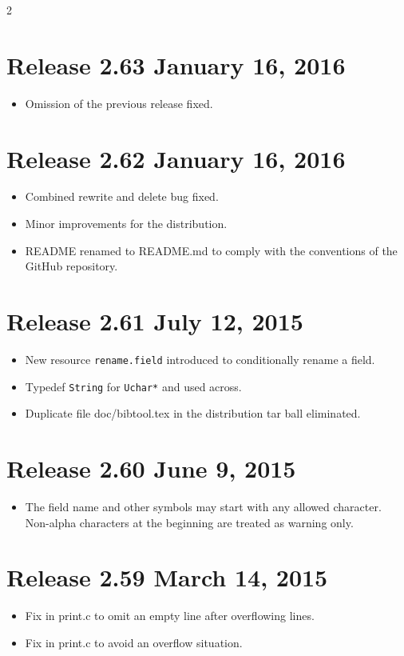 \documentclass[11pt,a4paper]{scrartcl}
\newcommand\rsc[1]{\texttt{#1}}
\newcommand\File[1]{\textsf{#1}}
\newenvironment{Releases}{\begin{multicols}2\RaggedRight}{\end{multicols}}
\newenvironment{Release}[2]{%
  \def\tmp{#2}%
  \section*{Release #1 \ifx\tmp\empty\else{\normalsize[#2]}\fi}
  \begin{itemize}
}{\end{itemize}}
\newenvironment{Fix}[1]{\item }{}
\newenvironment{New}[1]{\item }{}
\newenvironment{Update}[1]{\item }{}
\begin{document}
\begin{Releases}
 \begin{Release}{2.63}{January 16, 2016}
  \begin{Fix}{gene}
    Omission of the previous release fixed.
  \end{Fix}
 \end{Release}

 \begin{Release}{2.62}{January 16, 2016}
  \begin{Fix}{gene}
    Combined rewrite and delete bug fixed.
  \end{Fix}
  \begin{Update}{gene}
    Minor improvements for the distribution.
  \end{Update}
  \begin{Update}{gene}
    \File{README} renamed to \File{README.md} to comply with the
    conventions of the GitHub repository.
  \end{Update}
 \end{Release}

 \begin{Release}{2.61}{July 12, 2015}
  \begin{New}{gene}
    New resource \rsc{rename.field} introduced to conditionally rename a
    field.
  \end{New}
  \begin{Update}{gene}
    Typedef \verb|String| for \verb|Uchar*| and used across.
  \end{Update}
  \begin{Fix}{gene}
    Duplicate file \File{doc/bibtool.tex} in the distribution tar ball
    eliminated.
  \end{Fix}
 \end{Release}

 \begin{Release}{2.60}{June 9, 2015}
  \begin{Fix}{gene}
    The field name and other symbols may start with any allowed
    character. Non-alpha characters at the beginning are treated as
    warning only.
  \end{Fix}
 \end{Release}

 \begin{Release}{2.59}{March 14, 2015}
  \begin{Fix}{gene}
    Fix in \File{print.c} to omit an empty line after overflowing lines.
  \end{Fix}
  \begin{Fix}{gene}
    Fix in \File{print.c} to avoid an overflow situation.
  \end{Fix}
 \end{Release}


\end{Releases}
\end{document}
